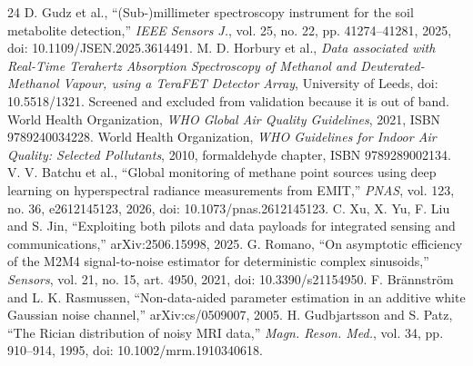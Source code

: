 \documentclass[conference]{IEEEtran}
\begin{document}
\begin{thebibliography}{24}
 D. Gudz et al., ``(Sub-)millimeter spectroscopy instrument for the soil metabolite detection,'' \emph{IEEE Sensors J.}, vol. 25, no. 22, pp. 41274--41281, 2025, doi: 10.1109/JSEN.2025.3614491.
 M. D. Horbury et al., \emph{Data associated with Real-Time Terahertz Absorption Spectroscopy of Methanol and Deuterated-Methanol Vapour, using a TeraFET Detector Array}, University of Leeds, doi: 10.5518/1321. Screened and excluded from validation because it is out of band.
 World Health Organization, \emph{WHO Global Air Quality Guidelines}, 2021, ISBN 9789240034228.
 World Health Organization, \emph{WHO Guidelines for Indoor Air Quality: Selected Pollutants}, 2010, formaldehyde chapter, ISBN 9789289002134.
 V. V. Batchu et al., ``Global monitoring of methane point sources using deep learning on hyperspectral radiance measurements from EMIT,'' \emph{PNAS}, vol. 123, no. 36, e2612145123, 2026, doi: 10.1073/pnas.2612145123.
 C. Xu, X. Yu, F. Liu and S. Jin, ``Exploiting both pilots and data payloads for integrated sensing and communications,'' arXiv:2506.15998, 2025.
 G. Romano, ``On asymptotic efficiency of the M2M4 signal-to-noise estimator for deterministic complex sinusoids,'' \emph{Sensors}, vol. 21, no. 15, art. 4950, 2021, doi: 10.3390/s21154950.
 F. Br\"annstr\"om and L. K. Rasmussen, ``Non-data-aided parameter estimation in an additive white Gaussian noise channel,'' arXiv:cs/0509007, 2005.
 H. Gudbjartsson and S. Patz, ``The Rician distribution of noisy MRI data,'' \emph{Magn. Reson. Med.}, vol. 34, pp. 910--914, 1995, doi: 10.1002/mrm.1910340618.
\end{thebibliography}
\end{document}
